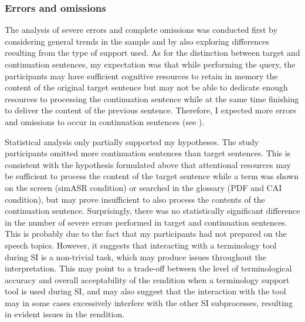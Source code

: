 \subsubsection{Errors and omissions} \label{erromdisc}
The analysis of severe errors and complete omissions was conducted first by considering general trends in the sample and by also exploring differences resulting from the type of support used. As for the distinction between target and continuation sentences, my expectation was that while performing the query, the participants may have sufficient cognitive resources to retain in memory the content of the original target sentence but may not be able to dedicate enough resources to processing the continuation sentence while at the same time finishing to deliver the content of the previous sentence. Therefore, I expected more errors and omissions to occur in continuation sentences (see ).

Statistical analysis only partially supported my hypotheses. The study participants omitted more continuation sentences than target sentences. This is consistent with the hypothesis formulated above that attentional resources may be sufficient to process the content of the target sentence while a term was shown on the screen (simASR condition) or searched in the glossary (PDF and CAI condition), but may prove insufficient to also process the contents of the continuation sentence. Surprisingly, there was no statistically significant difference in the number of severe errors performed in target and continuation sentences. This is probably due to the fact that my participants had not prepared on the speech topics. However, it suggests that interacting with a terminology tool during SI is a non-trivial task, which may produce issues throughout the interpretation. This may point to a trade-off between the level of terminological accuracy and overall acceptability of the rendition when a terminology support tool is used during SI, and may also suggest that the interaction with the tool may in some cases excessively interfere with the other SI subprocesses, resulting in evident issues in the rendition.

